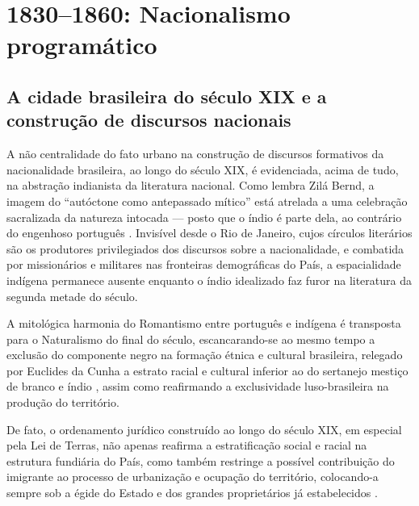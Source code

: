 \hypertarget{nacionalismo-programuxe1tico}{%
\section{1830--1860: Nacionalismo
programático}\label{nacionalismo-programuxe1tico}}

\hypertarget{a-cidade-brasileira-do-suxe9culo-xix-e-a-construuxe7uxe3o-de-discursos-nacionais}{%
\subsection{A cidade brasileira do século XIX e a construção de
discursos
nacionais}\label{a-cidade-brasileira-do-suxe9culo-xix-e-a-construuxe7uxe3o-de-discursos-nacionais}}

A não centralidade do fato urbano na construção de discursos formativos
da nacionalidade brasileira, ao longo do século XIX, é evidenciada,
acima de tudo, na abstração indianista da literatura nacional. Como
lembra Zilá Bernd, a imagem do ``autóctone como antepassado mítico''
está atrelada a uma celebração sacralizada da natureza intocada ---
posto que o índio é parte dela, ao contrário do engenhoso português
\autocite[p.~37--38]{bernd:1992literatura}. Invisível desde o Rio de
Janeiro, cujos círculos literários são os produtores privilegiados dos
discursos sobre a nacionalidade, e combatida por missionários e
militares nas fronteiras demográficas do País, a espacialidade indígena
permanece ausente enquanto o índio idealizado faz furor na literatura da
segunda metade do século.

A mitológica harmonia do Romantismo entre português e indígena é
transposta para o Naturalismo do final do século, escancarando-se ao
mesmo tempo a exclusão do componente negro na formação étnica e cultural
brasileira, relegado por Euclides da Cunha a estrato racial e cultural
inferior ao do sertanejo mestiço de branco e índio
\autocite[p.~44]{bernd:1992literatura}, assim como reafirmando a
exclusividade luso-brasileira na produção do território.

De fato, o ordenamento jurídico construído ao longo do século XIX, em
especial pela Lei de Terras, não apenas reafirma a estratificação social
e racial na estrutura fundiária do País, como também restringe a
possível contribuição do imigrante ao processo de urbanização e ocupação
do território, colocando-a sempre sob a égide do Estado e dos grandes
proprietários já estabelecidos \autocite[p.~198]{depaula:2011processo}.

